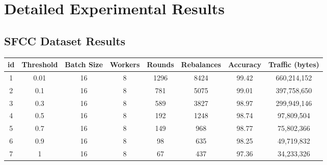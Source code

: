 \chapter{Detailed Experimental Results}\label{ch:detailed-experimental-results}


\section{SFCC Dataset Results}\label{sec:sfcc-dataset-results}

\begin{table}[H]
    \begin{tabular}{|c|c|c|c|c|c|c|c|}
        \hline
        \textbf{id}            & \textbf{Threshold}    & \textbf{Batch Size}   & \textbf{Workers}      & \textbf{Rounds}       & \textbf{Rebalances}   & \textbf{Accuracy}     & \textbf{Traffic (bytes)} \\
        \hline
        1                      & 0.01                  & 16                    & 8                     & 1296                  & 8424                  & 99.42                 & 660,214,152              \\
        2                      & 0.1                   & 16                    & 8                     & 781                   & 5075                  & 99.01                 & 397,758,650              \\
        3                      & 0.3                   & 16                    & 8                     & 589                   & 3827                  & 98.97                 & 299,949,146              \\
        4                      & 0.5                   & 16                    & 8                     & 192                   & 1248                  & 98.74                 & 97,809,504               \\
        5                      & 0.7                   & 16                    & 8                     & 149                   & 968                   & 98.77                 & 75,802,366               \\
        6                      & 0.9                   & 16                    & 8                     & 98                    & 635                   & 98.25                 & 49,719,832               \\
        7                      & 1                     & 16                    & 8                     & 67                    & 437                   & 97.36                 & 34,233,326               \\

\end{tabular}
\end{table}
